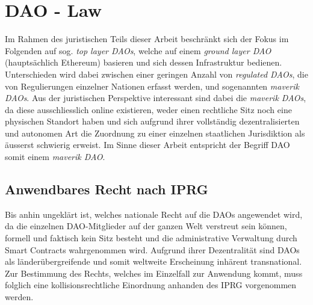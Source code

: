 \documentclass[a4paper,12pt]{report}
\begin{document}
	
	\chapter{DAO - Law}
	
	Im Rahmen des juristischen Teils dieser Arbeit beschränkt sich der Fokus im Folgenden auf sog. \textit{top layer DAOs}, welche auf einem \textit{ground layer DAO} (hauptsächlich Ethereum) basieren und sich dessen Infrastruktur bedienen. 
	Unterschieden wird dabei zwischen einer geringen Anzahl von \textit{regulated DAOs}, die von Regulierungen einzelner Nationen erfasst werden, und sogenannten \textit{maverik DAOs}. Aus der juristischen Perspektive interessant sind dabei die \textit{maverik DAOs}, da diese ausschliesslich online existieren, weder einen rechtliche Sitz noch eine physischen Standort haben und sich aufgrund ihrer vollständig dezentralisierten und autonomen Art die Zuordnung zu einer einzelnen staatlichen Jurisdiktion als äusserst schwierig erweist. Im Sinne dieser Arbeit entspricht der Begriff DAO somit einem \textit{maverik DAO}.
	
		\section{Anwendbares Recht nach IPRG}
	\startsection
	Bis anhin ungeklärt ist, welches nationale Recht auf die DAOs angewendet wird, da die einzelnen DAO-Mitglieder auf der ganzen Welt verstreut sein können, formell und faktisch kein Sitz besteht und die administrative Verwaltung durch Smart Contracts wahrgenommen wird. Aufgrund ihrer Dezentralität sind DAOs als länderübergreifende und somit weltweite Erscheinung inhärent transnational. Zur Bestimmung des Rechts, welches im Einzelfall zur Anwendung kommt, muss folglich eine kollisionsrechtliche Einordnung anhanden des IPRG vorgenommen werden.
	
\end{document}
